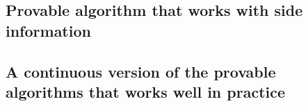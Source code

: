 \subsection{Provable algorithm that works with side information}
\subsection{A continuous version of the provable algorithms that works well in practice}
